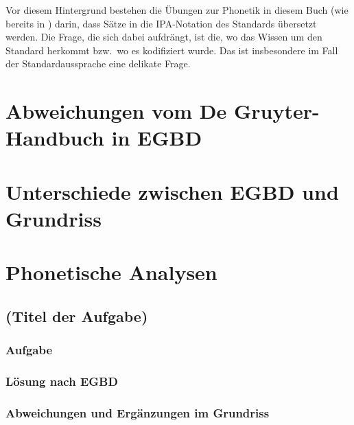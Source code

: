 Vor diesem Hintergrund bestehen die Übungen zur Phonetik in diesem Buch (wie bereits in \EGBD) darin, dass Sätze in die IPA-Notation des Standards übersetzt werden.
Die Frage, die sich dabei aufdrängt, ist die, wo das Wissen um den Standard herkommt bzw.\ wo es kodifiziert wurde.
Das ist insbesondere im Fall der Standardaussprache eine delikate Frage.

\citet{DeppermannEa2013,Kleiner2014}

\section{Abweichungen vom De Gruyter-Handbuch in EGBD}
\label{sec:phonetik:abweichungenvomdegruyterhandbuchinegbd}

\section{Unterschiede zwischen EGBD und Grundriss}
\label{sec:phonetik:unterschiedezwischenegbdundgrundriss}

\section{Phonetische Analysen}
\label{sec:phonetik:phonetischeanalysen}

\subsection{(Titel der Aufgabe)}

\subsubsection{Aufgabe}

\subsubsection{Lösung nach EGBD}

\subsubsection{Abweichungen und Ergänzungen im Grundriss}


